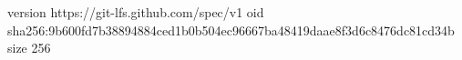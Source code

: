 version https://git-lfs.github.com/spec/v1
oid sha256:9b600fd7b38894884ced1b0b504ec96667ba48419daae8f3d6c8476dc81cd34b
size 256
